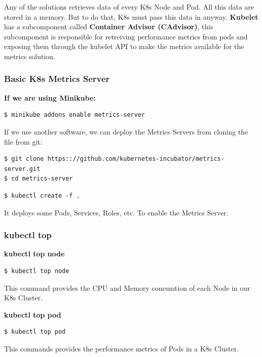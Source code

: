 \documentclass{article}
\newenvironment{codetemplate}[1][]{%
  \mybasecolorbox[#1]
  \itshape
}{%
  \endmybasecolorbox
}
\begin{document}
Any of the solutions retrieves data of every K8s Node and Pod. All this data are stored in a memory. But to do that, K8s must pass this data in anyway. \textbf{Kubelet} has a subcomponent called \textbf{Container Advisor (CAdvisor)}, this subcomponent is responsible for retreiving performance metrics from pods and exposing them through the kubelet API to make the metrics available for the metrics solution.

\subsubsection{Basic K8s Metrics Server}

\textbf{If we are using Minikube:}
\begin{codetemplate}{}
\begin{verbatim}
$ minikube addons enable metrics-server
\end{verbatim}
\end{codetemplate}  

If we use another software, we can deploy the Metrics Servers from cloning the file from git:
\begin{codetemplate}{}
\begin{verbatim}
$ git clone https:://github.com/kubernetes-incubator/metrics-server.git
$ cd metrics-server
\end{verbatim}
\end{codetemplate} 
\begin{codetemplate}{}
\begin{verbatim}
$ kubectl create -f .
\end{verbatim}
\end{codetemplate} 
It deploys some Pods, Services, Roles, etc. To enable the Metrics Server.

\subsubsection{kubectl top}
\textbf{kubectl top node}
\begin{codetemplate}{}
\begin{verbatim}
$ kubectl top node
\end{verbatim}
\end{codetemplate}
This command provides the CPU and Memory consumtion of each Node in our K8s Cluster.

\textbf{kubectl top pod}
\begin{codetemplate}{}
\begin{verbatim}
$ kubectl top pod
\end{verbatim}
\end{codetemplate}
This commands provides the performance metrics of Pods in a K8s Cluster.
\end{document}
